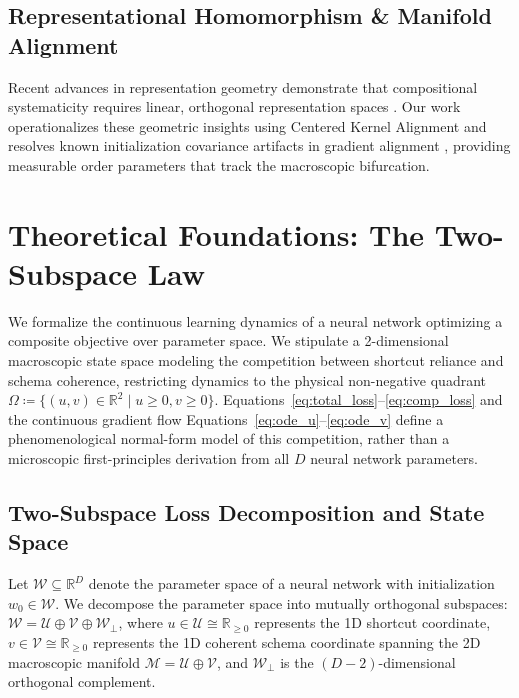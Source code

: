 \documentclass{article}
\theoremstyle{plain}
\theoremstyle{definition}
\begin{document}
\subsection{Representational Homomorphism \& Manifold Alignment}
Recent advances in representation geometry demonstrate that compositional systematicity requires linear, orthogonal representation spaces \citep{Uselis2026Compositional,An2026Representational,Lippl2024Kernel}. Our work operationalizes these geometric insights using Centered Kernel Alignment \citep{Kornblith2019Similarity,Raghu2021Vision,Davari2022Reliability} and resolves known initialization covariance artifacts in gradient alignment \citep{Raju2026Geometric,Sevetlidis2026Gauge}, providing measurable order parameters that track the macroscopic bifurcation.

\section{Theoretical Foundations: The Two-Subspace Law}
\label{sec:theory}

We formalize the continuous learning dynamics of a neural network optimizing a composite objective over parameter space. We stipulate a 2-dimensional macroscopic state space modeling the competition between shortcut reliance and schema coherence, restricting dynamics to the physical non-negative quadrant $\Omega \coloneqq \{ (u, v) \in \mathbb{R}^2 \mid u \ge 0, v \ge 0 \}$. Equations~\eqref{eq:total_loss}--\eqref{eq:comp_loss} and the continuous gradient flow Equations~\eqref{eq:ode_u}--\eqref{eq:ode_v} define a phenomenological normal-form model of this competition, rather than a microscopic first-principles derivation from all $D$ neural network parameters.

\subsection{Two-Subspace Loss Decomposition and State Space}
Let $\mathcal{W} \subseteq \mathbb{R}^D$ denote the parameter space of a neural network with initialization $w_0 \in \mathcal{W}$. We decompose the parameter space into mutually orthogonal subspaces: $\mathcal{W} = \mathcal{U} \oplus \mathcal{V} \oplus \mathcal{W}_\perp$, where $u \in \mathcal{U} \cong \mathbb{R}_{\ge 0}$ represents the 1D shortcut coordinate, $v \in \mathcal{V} \cong \mathbb{R}_{\ge 0}$ represents the 1D coherent schema coordinate spanning the 2D macroscopic manifold $\mathcal{M} = \mathcal{U} \oplus \mathcal{V}$, and $\mathcal{W}_\perp$ is the $(D-2)$-dimensional orthogonal complement.
\end{document}

